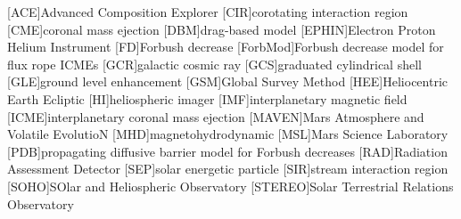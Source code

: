 	\begin{acronym}
	[ACE]{Advanced Composition Explorer}
	[CIR]{corotating interaction region}
	[CME]{coronal mass ejection}
	[DBM]{drag-based model}
	[EPHIN]{Electron Proton Helium Instrument}
	[FD]{Forbush decrease}
	[ForbMod]{Forbush decrease model for flux rope ICMEs \cite{Dumbovic2018-ForbMod}}
	[GCR]{galactic cosmic ray}
	[GCS]{graduated cylindrical shell}
	[GLE]{ground level enhancement}
	[GSM]{Global Survey Method \cite{Belov-2005-GSM}}
	[HEE]{Heliocentric Earth Ecliptic}
	[HI]{heliospheric imager}
	[IMF]{interplanetary magnetic field}
	[ICME]{interplanetary coronal mass ejection}
	[MAVEN]{Mars Atmosphere and Volatile EvolutioN}
	[MHD]{magnetohydrodynamic}
	[MSL]{Mars Science Laboratory}
	[PDB]{propagating diffusive barrier model for Forbush decreases \cite{Wibberenz-1998}}
	[RAD]{Radiation Assessment Detector}
	[SEP]{solar energetic particle}
	[SIR]{stream interaction region}
	[SOHO]{SOlar and Heliospheric Observatory}
	[STEREO]{Solar Terrestrial Relations Observatory}
	\end{acronym}
	

\endgroup

\cleardoublepage